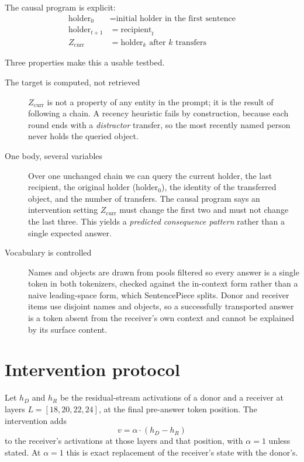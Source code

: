 \documentclass[11pt]{article}
\newcommand{\Zcurr}{\ensuremath{Z_{\mathrm{curr}}}}
\begin{document}
\noindent The causal program is explicit:
\begin{align*}
  \mathrm{holder}_0     &= \text{initial holder in the first sentence}\\
  \mathrm{holder}_{t+1} &= \mathrm{recipient}_t\\
  \Zcurr                &= \mathrm{holder}_k \text{ after } k \text{ transfers}
\end{align*}

Three properties make this a usable testbed.

\begin{description}
  \item[The target is computed, not retrieved] \Zcurr{} is not a property of
    any entity in the prompt; it is the result of following a chain. A recency
    heuristic fails by construction, because each round ends with a
    \emph{distractor} transfer, so the most recently named person never holds
    the queried object.
  \item[One body, several variables] Over one unchanged chain we can query the
    current holder, the last recipient, the original holder
    ($\mathrm{holder}_0$), the identity of the transferred object, and the
    number of transfers. The causal program says an intervention setting
    \Zcurr{} must change the first two and must not change the last three.
    This yields a \emph{predicted consequence pattern} rather than a single
    expected answer.
  \item[Vocabulary is controlled] Names and objects are drawn from pools
    filtered so every answer is a single token in both tokenizers, checked
    against the in-context form rather than a naive leading-space form, which
    SentencePiece splits. Donor and receiver items use disjoint names and
    objects, so a successfully transported answer is a token absent from the
    receiver's own context and cannot be explained by its surface content.
\end{description}

\section{Intervention protocol}
\label{sec:protocol}

Let $h_D$ and $h_R$ be the residual-stream activations of a donor and a
receiver at layers $L = [18, 20, 22, 24]$, at the final pre-answer token
position. The intervention adds
\[
  v = \alpha \cdot (h_D - h_R)
\]
to the receiver's activations at those layers and that position, with
$\alpha = 1$ unless stated. At $\alpha = 1$ this is exact replacement of the
receiver's state with the donor's.
\end{document}
